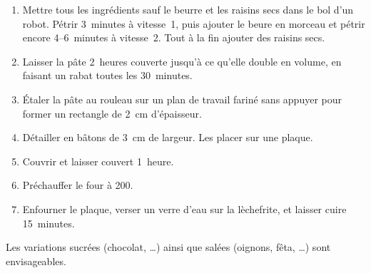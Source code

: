 
\begin{ingredients}
\end{ingredients}


\begin{recipe}
  \begin{enumerate}

  \item Mettre tous les ingrédients sauf le beurre et les raisins secs
    dans le bol d'un robot.  Pétrir 3~minutes à vitesse~1, puis
    ajouter le beure en morceau et pétrir encore 4--6~minutes à
    vitesse~2.  Tout à la fin ajouter des raisins secs.
    
  \item Laisser la pâte 2~heures couverte jusqu'à ce qu'elle double en
    volume, en faisant un rabat toutes les 30~minutes.
    
  \item Étaler la pâte au rouleau sur un plan de travail fariné sans
    appuyer pour former un rectangle de 2~cm d'épaisseur.
    
  \item Détailler en bâtons de 3~cm de largeur.  Les placer sur une
    plaque.
    
  \item Couvrir et laisser couvert 1~heure.
    
  \item Préchauffer le four à 200\degreeC.

  \item Enfourner le plaque, verser un verre d'eau sur la lèchefrite,
    et laisser cuire 15~minutes.
    
  \end{enumerate}
\end{recipe}

\notes Les variations sucrées (chocolat, \dots) ainsi que salées
(oignons, fêta, \dots) sont envisageables.

